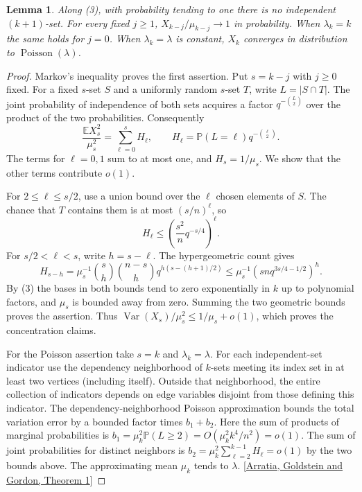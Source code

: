 \documentclass[11pt]{article}
\newtheorem{lemma}[theorem]{Lemma}
\newcommand{\E}{\mathbb E}
\newcommand{\Prob}{\mathbb P}
\newcommand{\pois}{\operatorname{Poisson}}
\begin{document}
\begin{lemma}\label{lem:counts}
Along (3), with probability tending to one there is no independent
$(k+1)$-set. For every fixed $j\ge 1$,
$X_{k-j}/\mu_{k-j}\to1$ in probability. When $\lambda_k=k$ the same
holds for $j=0$. When $\lambda_k=\lambda$ is constant,
$X_k$ converges in distribution to $\pois(\lambda)$.
\end{lemma}
\begin{proof}
Markov's inequality proves the first assertion. Put $s=k-j$ with
$j\ge0$ fixed. For a fixed $s$-set $S$ and a uniformly random $s$-set
$T$, write $L=|S\cap T|$. The joint probability of independence
of both sets acquires a factor $q^{-\binom L2}$ over the product of the
two probabilities. Consequently
\[
 \frac{\E X_s^2}{\mu_s^2}=\sum_{\ell=0}^s H_\ell,\qquad
 H_\ell=\Prob(L=\ell)q^{-\binom{\ell}{2}}.
\]
The terms for $\ell=0,1$ sum to at most one, and $H_s=1/\mu_s$.
We show that the other terms contribute $o(1)$.

For $2\le\ell\le s/2$, use a union bound over the $\ell$ chosen elements
of $S$. The chance that $T$ contains them is at most $(s/n)^\ell$, so
\[
 H_\ell\le\left(\frac{s^2}{n}q^{-s/4}\right)^\ell .
\]
For $s/2<\ell<s$, write $h=s-\ell$. The hypergeometric count gives
\[
 H_{s-h}
 =\mu_s^{-1}\binom{s}{h}\binom{n-s}{h}
      q^{h(s-(h+1)/2)}
 \le\mu_s^{-1}\left(sn q^{3s/4-1/2}\right)^h .
\]
By (3) the bases in both bounds tend to zero exponentially in $k$
up to polynomial factors, and $\mu_s$ is bounded away from zero.
Summing the two geometric bounds proves the assertion. Thus
$\operatorname{Var}(X_s)/\mu_s^2\le 1/\mu_s+o(1)$, which proves
the concentration claims.

For the Poisson assertion take $s=k$ and $\lambda_k=\lambda$.
For each independent-set indicator use the dependency neighborhood
of $k$-sets meeting its index set in at least two vertices (including
itself). Outside that neighborhood, the entire collection of indicators
depends on edge variables disjoint from those defining this indicator.
The dependency-neighborhood Poisson approximation bounds the total
variation error by a bounded factor times $b_1+b_2$. Here the sum of
products of marginal probabilities is
$b_1=\mu_k^2\Prob(L\ge2)=O(\mu_k^2 k^4/n^2)=o(1)$.
The sum of joint probabilities for distinct neighbors is
$b_2=\mu_k^2\sum_{\ell=2}^{k-1} H_\ell=o(1)$ by the two bounds above.
The approximating mean $\mu_k$ tends to $\lambda$.
[\href{https://doi.org/10.1214/aop/1176991491}{Arratia, Goldstein and Gordon, Theorem 1}]
\end{proof}
\end{document}
